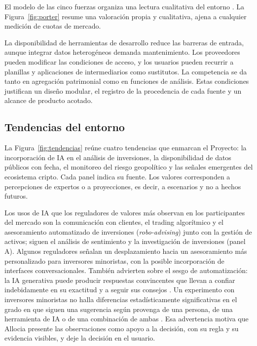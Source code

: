 El modelo de las cinco fuerzas organiza una lectura cualitativa del entorno \parencite{Porter1979}. La Figura~\ref{fig:porter} resume una valoración propia y cualitativa, ajena a cualquier medición de cuotas de mercado.


La disponibilidad de herramientas de desarrollo reduce las barreras de entrada, aunque integrar datos heterogéneos demanda mantenimiento. Los proveedores pueden modificar las condiciones de acceso, y los usuarios pueden recurrir a planillas y aplicaciones de intermediarios como sustitutos. La competencia se da tanto en agregación patrimonial como en funciones de análisis. Estas condiciones justifican un diseño modular, el registro de la procedencia de cada fuente y un alcance de producto acotado.

\subsection{Tendencias del entorno}\label{subsec:tendencias}

La Figura~\ref{fig:tendencias} reúne cuatro tendencias que enmarcan el Proyecto: la incorporación de IA en el análisis de inversiones, la disponibilidad de datos públicos con fecha, el monitoreo del riesgo geopolítico y las señales emergentes del ecosistema cripto. Cada panel indica su fuente. Los valores corresponden a percepciones de expertos o a proyecciones, es decir, a escenarios y no a hechos futuros.


Los usos de IA que los reguladores de valores más observan en los participantes del mercado son la comunicación con clientes, el trading algorítmico y el asesoramiento automatizado de inversiones (\textit{robo-advising}) junto con la gestión de activos; siguen el análisis de sentimiento y la investigación de inversiones (panel A). Algunos reguladores señalan un desplazamiento hacia un asesoramiento más personalizado para inversores minoristas, con la posible incorporación de interfaces conversacionales. También advierten sobre el sesgo de automatización: la IA generativa puede producir respuestas convincentes que llevan a confiar indebidamente en su exactitud y a seguir sus consejos \parencite{IOSCO2025ai}. Un experimento con inversores minoristas no halla diferencias estadísticamente significativas en el grado en que siguen una sugerencia según provenga de una persona, de una herramienta de IA o de una combinación de ambas \parencite{OSC2024ai}. Esa advertencia motiva que Allocia presente las observaciones como apoyo a la decisión, con su regla y su evidencia visibles, y deje la decisión en el usuario.

